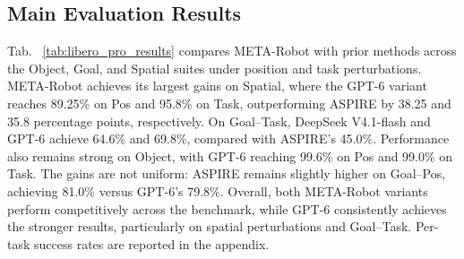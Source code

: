 \documentclass{article} %
\begin{document}
\subsection{Main Evaluation Results}
Tab. ~\ref{tab:libero_pro_results} compares META-Robot with prior methods across the Object, Goal, and Spatial suites under position and task perturbations. META-Robot achieves its largest gains on Spatial, where the GPT-6 variant reaches 89.25\% on Pos and 95.8\% on Task, outperforming ASPIRE by 38.25 and 35.8 percentage points, respectively. On Goal--Task, DeepSeek V4.1-flash and GPT-6 achieve 64.6\% and 69.8\%, compared with ASPIRE's 45.0\%. Performance also remains strong on Object, with GPT-6 reaching 99.6\% on Pos and 99.0\% on Task. The gains are not uniform: ASPIRE remains slightly higher on Goal--Pos, achieving 81.0\% versus GPT-6's 79.8\%. Overall, both META-Robot variants perform competitively across the benchmark, while GPT-6 consistently achieves the stronger results, particularly on spatial perturbations and Goal--Task. Per-task success rates are reported in the appendix.

\begin{table}[htbp]
\centering
\caption{LIBERO-Pro 评估各模型在 Object, Goal, Spatial 任务下的 Success Rate (\%)}
\label{tab:libero_pro_results}
\renewcommand{\arraystretch}{1.2}
\end{table}
\end{document}
